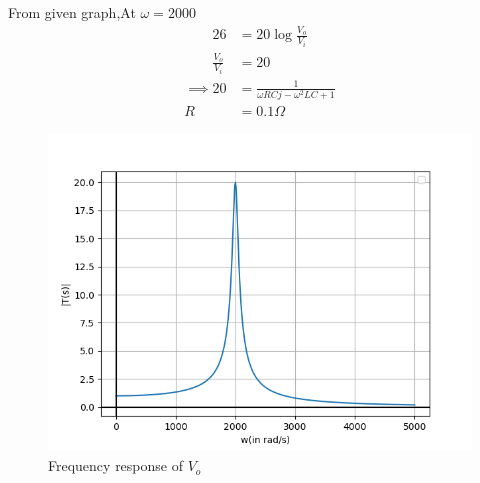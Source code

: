 \documentclass[journal,12pt,twocolumn]{IEEEtran}
\theoremstyle{remark}
\begin{document}
From given graph,At $\omega = 2000$
\begin{align}
    26 &= 20 \log \frac{V_o}{V_i}\\
    \frac{V_o}{V_i} &= 20
\end{align}
\begin{align}
    \implies 20 &= \frac{1}{\omega RCj -\omega^2LC + 1} \\
    R &= 0.1 \Omega
\end{align}
\begin{figure}[!h]
    \centering
    \includegraphics[width=\columnwidth]{figs/frequency_response.png}
    \caption{Frequency response of $V_o$}
    \label{frequency_response_2021_EE_20}
\end{figure}
\end{document}
